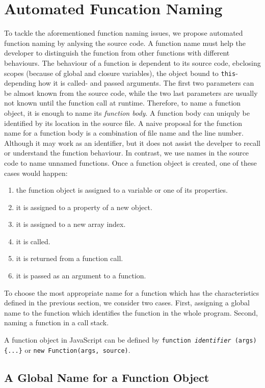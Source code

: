 \documentclass[conference]{IEEEtran}
\begin{document}
\section{Automated Funcation Naming}
    To tackle the aforementioned function naming issues, we propose automated function naming by anlysing the source code. A function name must help the developer to
distinguish the function from other functions with different behaviours. The behaviour of a function is dependent to its source code, ebclosing scopes (because of global and closure variables), the object bound to {\small\texttt{this}}-depending how it is called- and passed arguments. The first two parameters can be almost known from the source code, while the two last parameters are usually not known until the function call at runtime. Therefore, to name a function object, it is enough to name its \textit{function body}. 
    A function body can uniquly be identified by its location in the source file. A naive proposal for the function name for a function body is a combination of file name and the line number. Although it may work as an identifier, but it does not assist the develper to recall or understand the function behaviour. In contrast, we use names in the source code to name unnamed functions. 
    Once a function object is created, one of these cases would happen:
    \begin{enumerate}
		\item the function object is assigned to a variable or one of its properties.
		\item it is assigned to a property of a new object.
		\item it is assigned to a new array index.
		\item it is called.
		\item it is returned from a function call.
		\item it is passed as an argument to a function.
		\end{enumerate}
   

To choose the most appropriate name for a function which has the characteristics defined in the previous section, we consider two cases. First, assigning a global name to the function which identifies the function in the whole program. Second, naming a function in a call stack.

A function object in JavaScript can be defined by \texttt{function \textit{identifier} (args)\{...\}} or \texttt{new Function(args, source)}.
\subsection{A Global Name for a Function Object}
\end{document}
